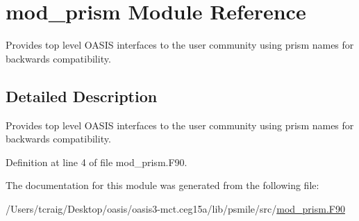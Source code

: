 \hypertarget{classmod__prism}{\section{mod\+\_\+prism Module Reference}
\label{classmod__prism}
}


Provides top level O\+A\+S\+I\+S interfaces to the user community using prism names for backwards compatibility.  




\subsection{Detailed Description}
Provides top level O\+A\+S\+I\+S interfaces to the user community using prism names for backwards compatibility. 

Definition at line 4 of file mod\+\_\+prism.\+F90.



The documentation for this module was generated from the following file\+:\begin{DoxyCompactItemize}
\item 
/\+Users/tcraig/\+Desktop/oasis/oasis3-\/mct.\+ceg15a/lib/psmile/src/\hyperlink{mod__prism_8_f90}{mod\+\_\+prism.\+F90}\end{DoxyCompactItemize}
